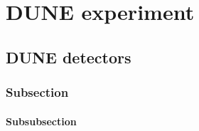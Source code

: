 \chapter{DUNE experiment}\label{chapterDUNE}


\section{DUNE detectors}

\subsection{Subsection}

\subsubsection{Subsubsection}